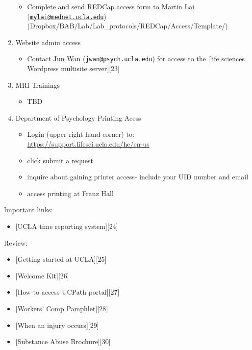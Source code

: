 \documentclass[]{book}
\providecommand{\tightlist}{%
  \setlength{\itemsep}{0pt}\setlength{\parskip}{0pt}}
\begin{document}
\begin{enumerate}
  \begin{itemize}
  \tightlist
  \item
    Complete and send REDCap access form to Martin Lai (\href{mailto:mylai@mednet.ucla.edu}{\nolinkurl{mylai@mednet.ucla.edu}}) (Dropbox/BAB/Lab/Lab\_protocols/REDCap/Access/Template/)
  \end{itemize}
\item
  Website admin access

  \begin{itemize}
  \tightlist
  \item
    Contact Jun Wan (\href{mailto:jwan@psych.ucla.edu}{\nolinkurl{jwan@psych.ucla.edu}}) for access to the {[}life sciences Wordpress multisite server{]}{[}23{]}
  \end{itemize}
\item
  MRI Trainings

  \begin{itemize}
  \tightlist
  \item
    TBD
  \end{itemize}
\item
  Department of Psychology Printing Acess

  \begin{itemize}
  \tightlist
  \item
    Login (upper right hand corner) to: \url{https://support.lifesci.ucla.edu/hc/en-us}
  \item
    click submit a request
  \item
    inquire about gaining printer access- include your UID number and email
  \item
    access printing at Franz Hall
  \end{itemize}
\end{enumerate}

Important links:

\begin{itemize}
\tightlist
\item
  {[}UCLA time reporting system{]}{[}24{]}
\end{itemize}

Review:

\begin{itemize}
\tightlist
\item
  {[}Getting started at UCLA{]}{[}25{]}
\item
  {[}Welcome Kit{]}{[}26{]}
\item
  {[}How-to access UCPath portal{]}{[}27{]}
\item
  {[}Workers' Comp
  Pamphlet{]}{[}28{]}
\item
  {[}When an injury occurs{]}{[}29{]}
\item
  {[}Substance Abuse Brochure{]}{[}30{]}
\end{itemize}
\end{document}

